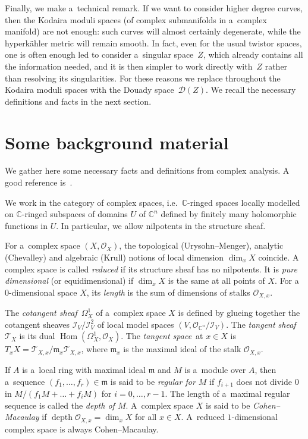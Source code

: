 \documentclass[pdftex]{sigma}
\numberwithin{equation}{section}
\begin{document}
Finally, we make a~technical remark.
If we want to consider higher degree curves, then the Kodaira moduli spaces (of complex submanifolds in a~complex
manifold) are not enough: such curves will almost certainly degenerate, while the hyperk\"ahler metric will remain
smooth.
In fact, even for the usual twistor spaces, one is often enough led to consider a~singular space~$Z$, which already
contains all the information needed, and it is then simpler to work directly with~$Z$ rather than resolving its
singularities.
For these reasons we replace throughout the Kodaira moduli spaces with the Douady space~${\mathcal{D}}(Z)$.
We recall the necessary def\/initions and facts in the next section.

\section{Some background material
\label{back}
}

We gather here some necessary facts and def\/initions from complex analysis.
A good reference is~\cite{GR}.

We work in the category of complex spaces, i.e.\
${\mathbb C}$-ringed spaces locally modelled on ${\mathbb C}$-ringed subspaces of domains $U$ of ${\mathbb C}^n$ def\/ined
by f\/initely many holomorphic functions in $U$.
In particular, we allow nilpotents in the structure sheaf.

For a~complex space $(X,{\mathcal{O}}_X)$, the topological (Urysohn--Menger), analytic (Chevalley) and algebraic (Krull)
notions of local dimension $\dim_xX$ coincide.
A complex space is called {\em reduced} if its structure sheaf has no nilpotents.
It is {\em pure dimensional} (or equidimensional) if $\dim_x X$ is the same at all points of $X$.
For a~$0$-dimensional space $X$, its {\em length} is the sum of dimensions of stalks ${\mathcal{O}}_{X,x}$.

The {\em cotangent sheaf}\, $\Omega^1_X$ of a~complex space $X$ is def\/ined by glueing together the cotangent sheaves
${\mathcal{I}}_V/{\mathcal{I}}_V^2$ of local model spaces $(V, {\mathcal{O}}_{{\mathbb C}^n}/{\mathcal{I}}_V)$.
The {\em tangent sheaf}\, ${\mathcal{T}}_X$ is its dual $\operatorname{Hom}(\Omega^1_X,{\mathcal{O}}_X)$.
The {\em tangent space}\, at $x\in X$ is $T_xX={\mathcal{T}}_{X,x}/\mathfrak{m}_x {\mathcal{T}}_{X,x}$, where
$\mathfrak{m}_x$ is the maximal ideal of the stalk ${\mathcal{O}}_{X,x}$.

If $A$ is a~local ring with maximal ideal $\mathfrak{m}$ and $M$ is a~module over $A$, then a~sequence
$(f_1,\dots,f_r)\in \mathfrak{m}$ is said to be {\em regular for $M$} if $f_{i+1}$ does not divide $0$ in
$M/(f_1M+\dots+f_iM)$ for $i=0,\dots, r-1$.
The length of a~maximal regular sequence is called the {\em depth of $M$}.
A~complex space $X$ is said to be {\em Cohen--Macaulay} if $\operatorname{depth}{\mathcal{O}}_{X,x}=\dim_xX$ for all
$x\in X$.
A~reduced $1$-dimensional complex space is always Cohen--Macaulay.
\end{document}
